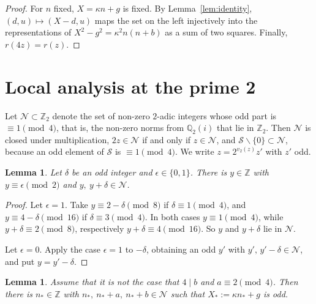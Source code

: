 \documentclass[11pt]{amsart}
\newtheorem{lemma}[theorem]{Lemma}
\theoremstyle{remark}
\theoremstyle{definition}
\numberwithin{equation}{section}
\newcommand{\Sc}{\mathcal{S}}
\newcommand{\Nc}{\mathcal{N}}
\newcommand{\Z}{\mathbb{Z}}
\newcommand{\Zt}{\mathbb{Z}_2}
\begin{document}
\begin{proof}
For $n$ fixed, $X=\kappa n+g$ is fixed. By Lemma~\ref{lem:identity}, $(d,u)\mapsto(X-d,u)$ maps the set on the left injectively into the representations of $X^2-g^2=\kappa^2n(n+b)$ as a sum of two squares. Finally, $r(4z)=r(z)$.
\end{proof}

\section{Local analysis at the prime 2}\label{sec:2adic}

Let $\Nc\subset\Zt$ denote the set of non-zero $2$-adic integers whose odd part is $\equiv1\pmod 4$, that is, the non-zero norms from $\mathbb Q_2(i)$ that lie in $\Zt$. Then $\Nc$ is closed under multiplication, $2z\in\Nc$ if and only if $z\in\Nc$, and $\Sc\smallsetminus\{0\}\subset\Nc$, because an odd element of $\Sc$ is $\equiv1\pmod 4$. We write $z=2^{v_2(z)}z'$ with $z'$ odd.

\begin{lemma}\label{lem:S}
Let $\delta$ be an odd integer and $\epsilon\in\{0,1\}$. There is $y\in\Z$ with $y\equiv\epsilon\pmod 2$ and $y,\ y+\delta\in\Nc$.
\end{lemma}

\begin{proof}
Let $\epsilon=1$. Take $y\equiv2-\delta\pmod 8$ if $\delta\equiv1\pmod4$, and $y\equiv4-\delta\pmod{16}$ if $\delta\equiv3\pmod 4$. In both cases $y\equiv1\pmod4$, while $y+\delta\equiv2\pmod 8$, respectively $y+\delta\equiv4\pmod{16}$. So $y$ and $y+\delta$ lie in $\Nc$.

Let $\epsilon=0$. Apply the case $\epsilon=1$ to $-\delta$, obtaining an odd $y'$ with $y',\,y'-\delta\in\Nc$, and put $y=y'-\delta$.
\end{proof}

\begin{lemma}\label{lem:nstar}
Assume that it is not the case that $4\mid b$ and $a\equiv2\pmod 4$. Then there is $n_*\in\Z$ with $n_*,\ n_*+a,\ n_*+b\in\Nc$ such that $X_*:=\kappa n_*+g$ is odd.
\end{lemma}
\end{document}
